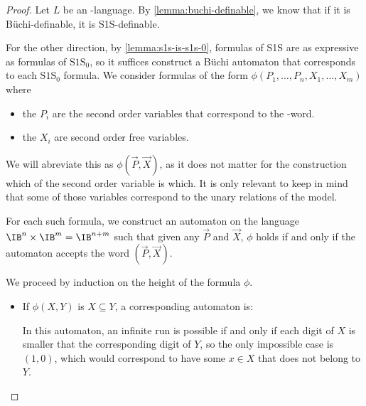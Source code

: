 \begin{proof}
    Let $L$ be an \w-language. By \autoref{lemma:buchi-definable},
    we know that if it is Büchi-definable, it is S1S-definable.

    For the other direction,
    by \autoref{lemma:s1s-is-s1s-0}, formulas of S1S
    are as expressive as formulas of $\text{S1S}_0$,
    so it suffices construct a Büchi automaton
    that corresponds to each $\text{S1S}_0$ formula.
    We consider formulas of the form
    $\phi(P_1, \dots, P_n, X_1, \dots, X_m)$
    where \begin{itemize}
        \item the $P_i$ are the second order variables that
            correspond to the \w-word.
        \item the $X_i$ are second order free variables.
    \end{itemize}
    We will abreviate this as $\phi(\vec P, \vec X)$,
    as it does not matter for the construction
    which of the second order variable is which.
    It is only relevant to keep in mind that some
    of those variables correspond to the unary relations
    of the model.

    For each such formula, we construct an
    automaton on the language $\IB^n \times \IB^m = \IB^{n+m}$
    such that given any $\vec P$ and $\vec X$, $\phi$ holds
    if and only if the automaton accepts the word $(\vec P, \vec X)$.

    We proceed by induction on the height of the formula $\phi$.
    \begin{itemize}
        \item If $\phi(X, Y)$ is $X \subseteq Y$,
            a corresponding automaton is:
            \begin{center}
            \end{center}
            In this automaton, an infinite run is possible
            if and only if each digit of $X$ is smaller that the
            corresponding digit of $Y$, so the only impossible case is $(1, 0)$,
            which would correspond to have some $x \in X$ that does not belong to $Y$.


\end{itemize}
\end{proof}
